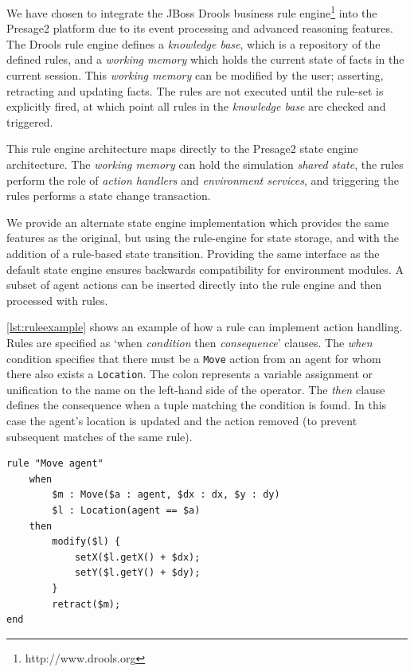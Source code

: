 We have chosen to integrate the JBoss Drools business rule
engine\footnote{http://www.drools.org} into the Presage2 platform due to its
event processing and advanced reasoning features. The Drools rule engine
defines a \emph{knowledge base}, which is a repository of the defined rules,
and a \emph{working memory} which holds the current state of facts in the
current session. This \emph{working memory} can be modified by the user;
asserting, retracting and updating facts. The rules are not executed until the
rule-set is explicitly fired, at which point all rules in the \emph{knowledge
base} are checked and triggered.

This rule engine architecture maps directly to the Presage2 state engine
architecture. The \emph{working memory} can hold the simulation \emph{shared
state}, the rules perform the role of \emph{action handlers} and \emph{
environment services}, and triggering the rules performs a state change
transaction.

We provide an alternate state engine implementation which provides the same
features as the original, but using the rule-engine for state storage, and
with the addition of a rule-based state transition. Providing the same
interface as the default state engine ensures backwards compatibility for
environment modules. A subset of agent actions can be inserted directly into
the rule engine and then processed with rules.

\autoref{lst:ruleexample} shows an example of how a rule can implement action
handling. Rules are specified as `when \emph{condition} then
\emph{consequence}' clauses. The \emph{when} condition specifies that there
must be a \texttt{Move} action from an agent for whom there also exists a
\texttt{Location}. The colon represents a variable assignment or unification
to the name on the left-hand side of the operator. The \emph{then} clause
defines the consequence when a tuple matching the condition is found. In this
case the agent's location is updated and the action removed (to prevent
subsequent matches of the same rule).

\begin{lstlisting}[caption={Drools rule example.},label=lst:ruleexample,float=tbph]
rule "Move agent"
    when
        $m : Move($a : agent, $dx : dx, $y : dy)
        $l : Location(agent == $a)
    then
        modify($l) {
            setX($l.getX() + $dx);
            setY($l.getY() + $dy);
        }
        retract($m);
end
\end{lstlisting}

